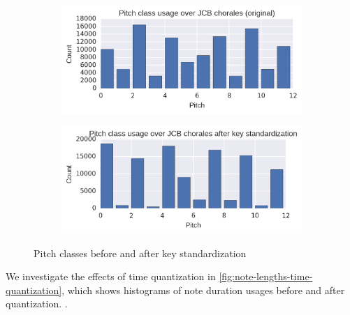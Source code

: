 \begin{figure}
    \centering
    \begin{subfigure}[b]{0.48\textwidth}
        \centering
        \includegraphics[width=1.0\linewidth]{pitch-class-usage-original.png}
    \end{subfigure}
    \begin{subfigure}[b]{0.48\textwidth}
        \centering
        \includegraphics[width=1.0\linewidth]{pitch-class-usage-preproc.png}
    \end{subfigure}
    \caption{Pitch classes before and after key standardization}
    \label{fig:pc-key-standardization}
\end{figure}

We investigate the effects of time quantization in
\cref{fig:note-lengths-time-quantization}, which shows histograms of note
duration usages before and after quantization. .

